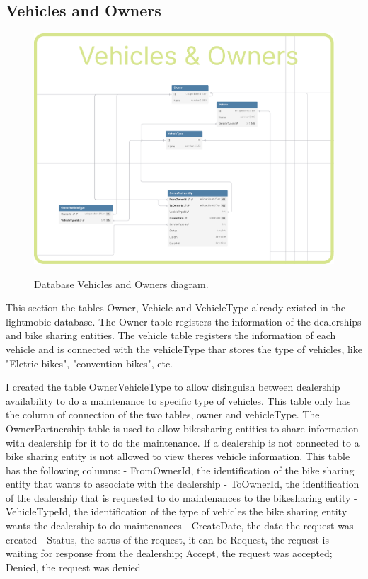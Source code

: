 \subsection{Vehicles and Owners} 


\begin{figure}[h]
  \caption{Database Vehicles and Owners diagram.}
  \centering
  \includegraphics[width=\textwidth]{figs/dbDiagrams/Vehicles_and_Owners}
  \label{fig:figure2}
\end{figure}


This section the tables Owner, Vehicle and VehicleType already existed in the lightmobie database.
The Owner table registers the information of the dealerships and bike sharing entities.
The vehicle table registers the information of each vehicle and is connected with the vehicleType thar stores the type of vehicles, like "Eletric bikes", "convention bikes", etc.

I created the table OwnerVehicleType to allow disinguish between dealership availability to do a maintenance to specific type of vehicles. This table only has the column of connection of the two tables, owner and vehicleType.
The OwnerPartnership table is used to allow bikesharing entities to share information with dealership for it to do the maintenance. If a dealership is not connected to a bike sharing entity is not allowed to view theres vehicle information.
This table has the following columns:
- FromOwnerId, the identification of the bike sharing entity that wants to associate with the dealership
- ToOwnerId, the identification of the dealership that is requested to do maintenances to the bikesharing entity
- VehicleTypeId, the identification of the type of vehicles the bike sharing entity wants the dealership to do maintenances
- CreateDate, the date the request was created
- Status, the satus of the request, it can be Request, the request is waiting for response from the dealership; Accept, the request was accepted; Denied, the request was denied


